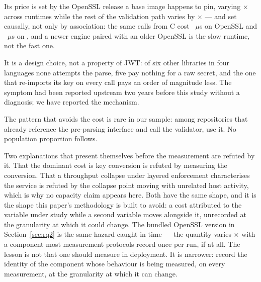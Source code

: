 \documentclass[pdflatex,sn-basic,twocolumn]{sn-jnl}%
\begin{document}
Its price is set by the OpenSSL release a base image happens to pin, varying
\SpanProbeThrows$\times$ across runtimes while the rest of the validation path
varies by \SpanJwtPreparsed$\times$ --- and set causally, not only by
association: the same calls from C cost \CFullVThreeZeroSixteen~$\mu$s on
OpenSSL \CVersionLiteralVThreeZeroSixteen{} and \CFullVThreeFiveEight~$\mu$s on \CVersionLiteralVThreeFiveEight, and a newer engine
paired with an older OpenSSL is the slow runtime, not the fast one.

It is a design choice, not a property of JWT: of six other libraries in four
languages none attempts the parse, five pay nothing for a raw secret, and the
one that re-imports its key on every call pays an order of magnitude less. The symptom had been reported upstream two
years before this study without a diagnosis; we have reported the mechanism.

The pattern that avoids the cost is rare in our sample: among
\CounterReposWithVerify{} repositories that already reference the pre-parsing
interface and call the validator, \AdjudicatedGenuineProjects{} use it. No
population proportion follows.

Two explanations that present themselves before the measurement are refuted by
it. That the dominant cost is key conversion is refuted by measuring the
conversion. That a throughput collapse under layered enforcement characterises
the service is refuted by the collapse point moving with unrelated host activity,
which is why no capacity claim appears here. Both have the same shape, and it is
the shape this paper's methodology is built to avoid: a cost attributed to the
variable under study while a second variable moves alongside it, unrecorded at
the granularity at which it could change. The bundled OpenSSL version in
Section~\ref{sec:rq2} is the same hazard caught in time --- the quantity varies
\SpanProbeThrows$\times$ with a component most measurement protocols record once
per run, if at all. The lesson is not that one should measure in deployment. It
is narrower: record the identity of the component whose behaviour is being
measured, on every measurement, at the granularity at which it can change.

\backmatter
\end{document}
